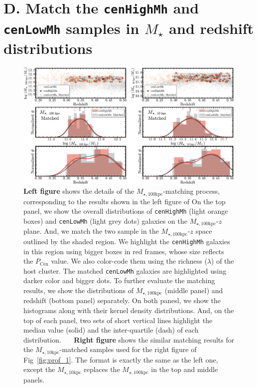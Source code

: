 \documentclass[a4paper,fleqn,usenatbib]{mnras}
\def\rbcg{\texttt{cenHighMh}}
\def\nbcg{\texttt{cenLowMh}}
\def\mstar{{$M_{\star}$}}
\def\minn{{$M_{\star,10\mathrm{kpc}}$}}
\def\mtot{{$M_{\star,100\mathrm{kpc}}$}}
\begin{document}

\section{D. Match the \rbcg{} and \nbcg{} samples in \mstar{} and redshift distributions}
    \label{app:match}

\begin{figure}
    \centering 
    \includegraphics[width=\textwidth]{fig/redbcg_match}
    \caption{
        \textbf{Left figure} shows the details of the \mtot{}-matching process, 
        corresponding to the results shown in the left figure of   
        On the top panel, we show the overall distributions of \rbcg{} (light orange boxes) 
        and \nbcg{} (light grey dots) galaxies on the \mtot{}-$z$ plane.  
        And, we match the two sample in the \mtot{}-$z$ space outlined by the shaded region.
        We highlight the \rbcg{} galaxies in this region using bigger boxes in red frames, 
        whose size reflects the $P_{\mathrm{Cen}}$ value.  
        We also color-code them using the richness ($\lambda$) of the host cluster. 
        The matched \nbcg{} galaxies are highlighted using darker color and bigger dots. 
        To further evaluate the matching results, we show the distributions of \mtot{} 
        (middle panel) and redshift (bottom panel) separately. 
        On both panesl, we show the histograms along with their kernel density 
        distributions.  
        And, on the top of each panel, two sets of short vertical lines highlight the median 
        value (solid) and the inter-quartile (dash) of each distribution.~~~
        \textbf{Right figure} shows the similar matching results for the \minn{}-matched
        samples used for the right figure of Fig~\ref{fig:prof_1}.
        The format is exactly the same as the left one, except the \minn{} replaces the 
        \mtot{} in the top and middle panels.}
    \label{fig:match}
\end{figure}
    
\end{document}
